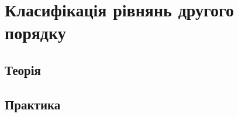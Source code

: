 




\section{Класифікація рівнянь другого порядку}
    \subsection{Теорія}
        
    \subsection{Практика}
        

% 

% 


